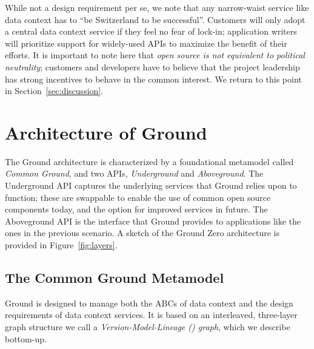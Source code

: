\documentclass{sig-alternate}
\begin{document}
  While not a design requirement per se, we note that any narrow-waist service like data context has to ``be Switzerland to be successful''.  
Customers will only adopt a central data context service if they feel no fear of lock-in; application writers will prioritize support for widely-used APIs to maximize the benefit of their efforts. 
It is important to note here that \emph{open source is not equivalent to political neutrality}; customers and developers have to believe that the project leadership has strong incentives to behave in the common interest. 
We return to this point in Section~\ref{sec:discussion}.

\vspace{1em}

\section{Architecture of Ground}
\label{sec:arch}
The Ground architecture is characterized by a foundational metamodel called \emph{Common Ground}, and two APIs, \emph{Underground} and \emph{Aboveground}.  The Underground API captures the underlying services that Ground relies upon to function; these are swappable to enable the use of common open source components today, and the option for improved services in future. The Aboveground API is the interface that Ground provides to applications like the ones in the previous scenario.
A sketch of the Ground Zero architecture is provided in Figure~\ref{fig:layers}.


\subsection{The Common Ground Metamodel}
\label{sec:metamodel}
Ground is designed to manage both the ABCs of data context and the design requirements of data context services.
It is based on an interleaved, three-layer graph structure we call a \emph{Version-Model-Lineage (\vml) graph}, which we describe bottom-up.
\end{document}
